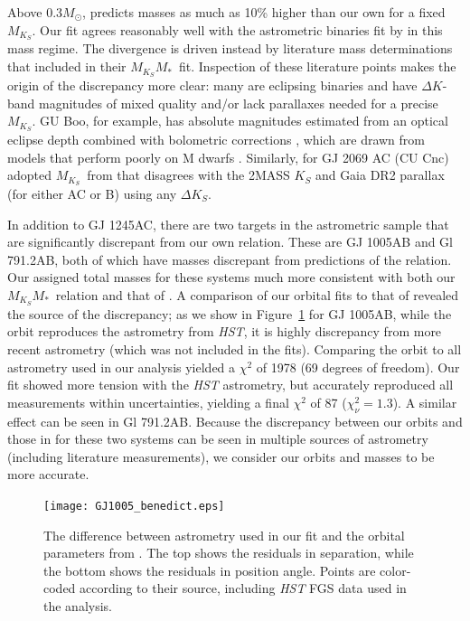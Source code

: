 \documentclass[twocolumn]{aastex62}
\newcommand{\mks}{$M_{K_S}$}
\newcommand{\mmk}{$M_{K_S}$\textendash$M_*$}
\begin{document}
 Above 0.3$M_\odot$, \citet{Benedict2016} predicts masses as much as 10\% higher than our own for a fixed \mks. Our fit agrees reasonably well with the astrometric binaries fit by \citet{Benedict2016} in this mass regime. The divergence is driven instead by literature mass determinations that \citet{Benedict2016} included in their \mmk\ fit. Inspection of these literature points makes the origin of the discrepancy more clear: many are eclipsing binaries and have $\Delta K$-band magnitudes of mixed quality and/or lack parallaxes needed for a precise \mks. GU Boo, for example, has absolute magnitudes estimated from an optical eclipse depth combined with bolometric corrections \citep{Lopez2005}, which are drawn from models that perform poorly on M dwarfs \citep{1998A&AS..130...65L,Hauschildt1999}. Similarly, for GJ 2069 AC (CU Cnc) \citet{Benedict2016} adopted \mks\ from \citet{Ribas2003} that disagrees with the 2MASS $K_S$ and Gaia DR2 parallax (for either AC or B) using any $\Delta K_S$. 
 
In addition to GJ 1245AC, there are two targets in the \citet{Benedict2016} astrometric sample that are significantly discrepant from our own relation. These are GJ 1005AB and Gl 791.2AB, both of which have masses discrepant from predictions of the \citet{Benedict2016} relation. Our assigned total masses for these systems much more consistent with both our \mmk\ relation and that of \citet{Benedict2016}.  A comparison of our orbital fits to that of \citet{Benedict2016} revealed the source of the discrepancy; as we show in Figure~\ref{fig:gj1005} for GJ 1005AB, while the \citet{Benedict2016} orbit reproduces the astrometry from {\it HST}, it is highly discrepancy from more recent astrometry (which was not included in the \citet{Benedict2016} fits). Comparing the \citet{Benedict2016} orbit to all astrometry used in our analysis yielded a $\chi^2$ of 1978 (69 degrees of freedom). Our fit showed more tension with the {\it HST} astrometry, but accurately reproduced all measurements within uncertainties, yielding a final $\chi^2$ of 87 ($\chi^2_\nu=1.3$). A similar effect can be seen in Gl 791.2AB. Because the discrepancy between our orbits and those in \citet{Benedict2016} for these two systems can be seen in multiple sources of astrometry (including literature measurements), we consider our orbits and masses to be more accurate. 
 
 \begin{figure}[htb]
\begin{center}
\texttt{[image: GJ1005\_benedict.eps]}
\caption{The difference between astrometry used in our fit and the orbital parameters from \citet{Benedict2016}. The top shows the residuals in separation, while the bottom shows the residuals in position angle. Points are color-coded according to their source, including {\it HST} FGS data used in the \citet{Benedict2016} analysis. }
\label{fig:gj1005}
\end{center}
\end{figure}
\end{document}
